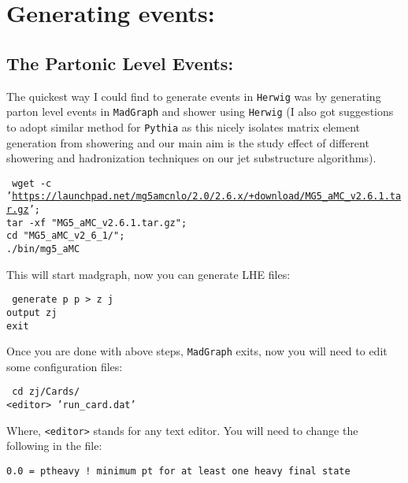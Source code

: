 \section{Generating events:}
\subsection{The Partonic Level Events:}
The quickest way I could find to generate events in {\tt Herwig} was by generating parton level events in {\tt MadGraph} and shower using {\tt Herwig} (I also got suggestions to adopt similar method for {\tt Pythia} as this nicely isolates matrix element generation from showering and our main aim is the study effect of different showering and hadronization techniques on our jet substructure algorithms).
\begin{center}
    \begin{minipage}{0.9\textwidth}
        \small{
            { \tt
                wget -c '\url{https://launchpad.net/mg5amcnlo/2.0/2.6.x/+download/MG5_aMC_v2.6.1.tar.gz}';\\
                tar -xf "MG5\_aMC\_v2.6.1.tar.gz";\\
                cd "MG5\_aMC\_v2\_6\_1/";\\
                ./bin/mg5\_aMC
            }
        }
    \end{minipage}
\end{center}
This will start madgraph, now you can generate LHE files:
\begin{center}
    \begin{minipage}{0.7\textwidth}
        {\tt
            generate p p > z j\\
            output zj\\
            exit
        }
    \end{minipage}
\end{center}
Once you are done with above steps, {\tt MadGraph} exits, now you will need to edit some configuration files:
\begin{center}
    \begin{minipage}{0.7\textwidth}
        {\tt
            cd zj/Cards/\\
            <editor> 'run\_card.dat'\\
        }
    \end{minipage}
\end{center}
Where, {\tt <editor>} stands for any text editor. You will need to change the following in the file:
\begin{center}
    \begin{minipage}{0.7\textwidth}
        {\tt 0.0  = ptheavy   ! minimum pt for at least one heavy final state}
    \end{minipage}
\end{center}
